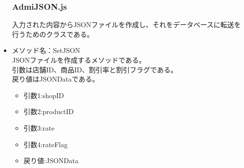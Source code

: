 \documentclass[a4j]{jarticle}
\begin{document}
\begin{itemize}
\subsubsection{AdmiJSON.js}

入力された内容からJSONファイルを作成し、それをデータベースに転送を行うためのクラスである。\\

\item メソッド名：SetJSON\\

JSONファイルを作成するメソッドである。\\
引数は店舗ID、商品ID、割引率と割引フラグである。\\
戻り値はJSONDataである。
	\begin{itemize}
		\item 引数1:shopID
		\item 引数2:productID
		\item 引数3:rate
		\item 引数4:rateFlag
	\end{itemize}
	\begin{itemize}
		\item 戻り値:JSONData
	\end{itemize}
\end{itemize}

\end{document}
